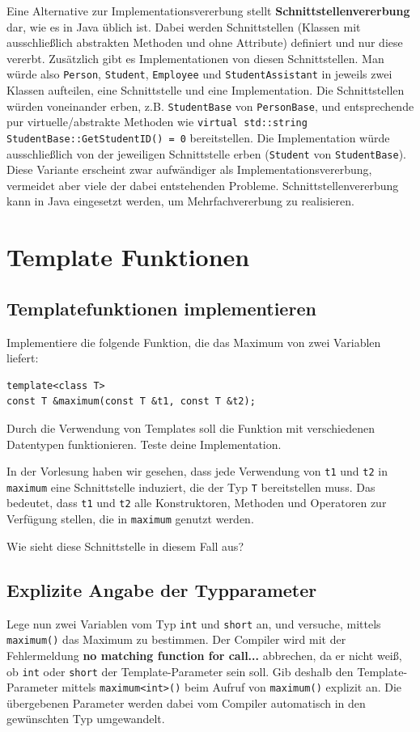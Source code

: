 Eine Alternative zur Implementationsvererbung stellt \textbf{Schnittstellenvererbung} dar, wie es in Java üblich ist. Dabei werden Schnittstellen (Klassen mit ausschließlich abstrakten Methoden und ohne Attribute) definiert und nur diese vererbt.
Zusätzlich gibt es Implementationen von diesen Schnittstellen.
Man würde also \texttt{Person}, \texttt{Student}, \texttt{Employee} und \texttt{StudentAssistant} in jeweils zwei Klassen aufteilen, eine Schnittstelle und eine Implementation.
Die Schnittstellen würden voneinander erben, z.B. \texttt{StudentBase} von \texttt{PersonBase}, und entsprechende pur virtuelle/abstrakte Methoden wie \texttt{virtual std::string StudentBase::GetStudentID() = 0} bereitstellen.
Die Implementation würde ausschließlich von der jeweiligen Schnittstelle erben (\texttt{Student} von \texttt{StudentBase}).
Diese Variante erscheint zwar aufwändiger als Implementationsvererbung, vermeidet aber viele der dabei entstehenden Probleme.
Schnittstellenvererbung kann in Java eingesetzt werden, um Mehrfachvererbung zu realisieren.



\newpage

\section{Template Funktionen}
\subsection{Templatefunktionen implementieren}
Implementiere die folgende Funktion, die das Maximum von zwei Variablen liefert:

\begin{lstlisting}
template<class T>
const T &maximum(const T &t1, const T &t2);
\end{lstlisting}

Durch die Verwendung von Templates soll die Funktion mit verschiedenen Datentypen funktionieren.
Teste deine Implementation.

In der Vorlesung haben wir gesehen, dass jede Verwendung von \texttt{t1} und \texttt{t2} in \texttt{maximum} eine Schnittstelle induziert, die der Typ \texttt{T} bereitstellen muss.
Das bedeutet, dass \texttt{t1} und \texttt{t2} alle Konstruktoren, Methoden und Operatoren zur Verfügung stellen, die in \texttt{maximum} genutzt werden.

Wie sieht diese Schnittstelle in diesem Fall aus?

\subsection{Explizite Angabe der Typparameter}
Lege nun zwei Variablen vom Typ \texttt{int} und \texttt{short} an, und versuche, mittels \texttt{maximum()} das Maximum zu bestimmen.
Der Compiler wird mit der Fehlermeldung \textbf{no matching function for call...} abbrechen, da er nicht weiß, ob \texttt{int} oder \texttt{short} der Template-Parameter sein soll.
Gib deshalb den Template-Parameter mittels \texttt{maximum<int>()} beim Aufruf von \texttt{maximum()} explizit an.
Die übergebenen Parameter werden dabei vom Compiler automatisch in den gewünschten Typ umgewandelt.

